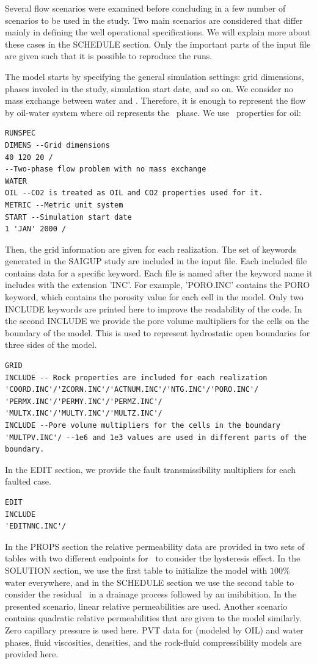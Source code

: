 Several flow scenarios were examined before concluding in a few number of scenarios to be used in the study. Two main scenarios are considered that differ mainly in defining the well operational specifications. We will explain more about these cases in the SCHEDULE section. Only the important parts of the input file are given such that it is possible to reproduce the runs.

The model starts by specifying the general simulation settings: grid dimensions, phases involed in the study, simulation start date, and so on. We consider no mass exchange between water and \coo. Therefore, it is enough to represent the flow by oil-water system where oil represents the \coo\ phase. We use \coo\ properties for oil:  
\begin{lstlisting}
RUNSPEC 
DIMENS --Grid dimensions
40 120 20 / 
--Two-phase flow problem with no mass exchange
WATER 
OIL --CO2 is treated as OIL and CO2 properties used for it.
METRIC --Metric unit system
START --Simulation start date 
1 'JAN' 2000 /  
\end{lstlisting}
Then, the grid information are given for each realization. The set of keywords generated in the SAIGUP study are included in the input file. Each included file contains data for a specific keyword. Each file is named after the keyword name it includes with the extension 'INC'. For example, 'PORO.INC' contains the PORO keyword, which contains the porosity value for each cell in the model. Only two INCLUDE keywords are printed  here to improve the readability of the code. In the second INCLUDE we provide the pore volume multipliers for the cells on the boundary of the model. This is used to represent hydrostatic open boundaries for three sides of the model.
\begin{lstlisting}
GRID 
INCLUDE -- Rock properties are included for each realization
'COORD.INC'/'ZCORN.INC'/'ACTNUM.INC'/'NTG.INC'/'PORO.INC'/
'PERMX.INC'/'PERMY.INC'/'PERMZ.INC'/
'MULTX.INC'/'MULTY.INC'/'MULTZ.INC'/
INCLUDE --Pore volume multipliers for the cells in the boundary
'MULTPV.INC'/ --1e6 and 1e3 values are used in different parts of the boundary.
\end{lstlisting}
In the EDIT section, we provide the fault transmissibility multipliers for each faulted case.
\begin{lstlisting}
EDIT
INCLUDE
'EDITNNC.INC'/ 
\end{lstlisting}
In the PROPS section the relative permeability data are provided in two sets of tables with two different endpoints for \coo\ to consider the hysteresis effect. In the SOLUTION section, we use the first table to initialize the model with $100\%$ water everywhere, and in the SCHEDULE section we use the second table to consider the residual \coo\ in a drainage process followed by an imibibition.  In the presented scenario, linear relative permeabilities are used. Another scenario contains quadratic relative permeabilities that are given to the model similarly. Zero capillary pressure is used here. PVT data for \coo(modeled by OIL) and water phases, fluid viscosities, densities, and the rock-fluid compressibility models are provided here.  
